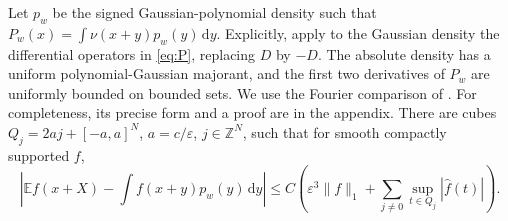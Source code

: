 \documentclass[10pt,letterpaper]{article}
\newcommand{\E}{\mathbb E}
\newcommand{\norm}[1]{\lVert#1\rVert}
\newcommand{\eps}{\varepsilon}
\newcommand{\dd}{\,\mathrm d}
\begin{document}
Let $p_w$ be the signed Gaussian-polynomial density such that $P_w(x)=\int\nu(x+y)p_w(y)\dd y$. Explicitly, apply to the Gaussian density the differential operators in \eqref{eq:P}, replacing $D$ by $-D$. The absolute density has a uniform polynomial-Gaussian majorant, and the first two derivatives of $P_w$ are uniformly bounded on bounded sets. We use the Fourier comparison of \cite[Lemmas 1--3]{db}. For completeness, its precise form and a proof are in the appendix. There are cubes $Q_j=2a j+[-a,a]^N$, $a=c/\eps$, $j\in\mathbb Z^N$, such that for smooth compactly supported $f$,
\begin{equation}
 \left|\E f(x+X)-\int f(x+y)p_w(y)\dd y\right|
 \le C\left(\eps^3\norm f_1+\sum_{j\ne0}\sup_{t\in Q_j}|\widehat f(t)|\right).
 \label{eq:cubes}
\end{equation}
\end{document}
